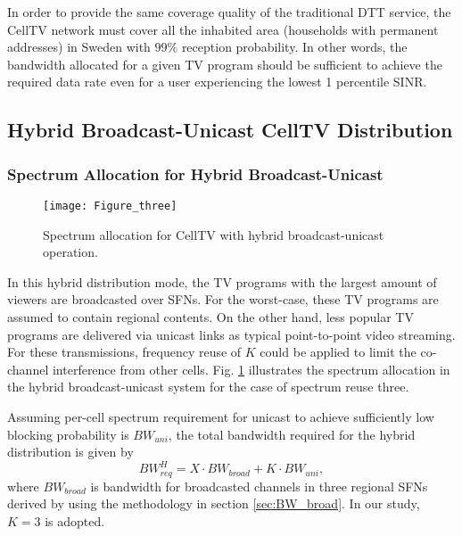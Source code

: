 \documentclass[journal]{IEEEtran}
\begin{document}
In order to provide the same coverage quality of the traditional DTT service, the CellTV network must cover all the inhabited area (households with permanent addresses) in Sweden with $99\%$ reception probability. In other words, the bandwidth allocated for a given TV program should be sufficient to achieve the required data rate even for a user experiencing the lowest 1 percentile SINR.


		
\subsection{Hybrid Broadcast-Unicast CellTV Distribution	}
\subsubsection{\textbf{Spectrum Allocation for Hybrid Broadcast-Unicast}}
\begin{figure}[t]
  \centering
  \texttt{[image: Figure\_three]}\\
  \caption{Spectrum allocation for CellTV with hybrid broadcast-unicast operation.}\label{fig:unicast_diag}
\end{figure}
In this hybrid distribution mode, the TV programs with the largest amount of viewers are broadcasted over SFNs. For the worst-case, these TV programs are assumed to contain regional contents. On the other hand, less popular TV programs are delivered via unicast links as typical point-to-point video streaming. For these transmissions, frequency reuse of $K$ could be applied to limit the co-channel interference from other cells. Fig. \ref{fig:unicast_diag} illustrates the spectrum allocation in the hybrid broadcast-unicast system for the case of spectrum reuse three.

Assuming per-cell spectrum requirement for unicast to achieve sufficiently low blocking probability is $BW_{uni}$, the total bandwidth required for the hybrid distribution is given by
\begin{equation}\label{eqn:BW_uni}
  	BW^H_{req}=X\cdot BW_{broad}+K\cdot BW_{uni},	
\end{equation}
where $BW_{broad}$ is bandwidth for broadcasted channels in three regional SFNs derived by using the methodology in section \ref{sec:BW_broad}. In our study, $K=3$ is adopted.
\end{document}
